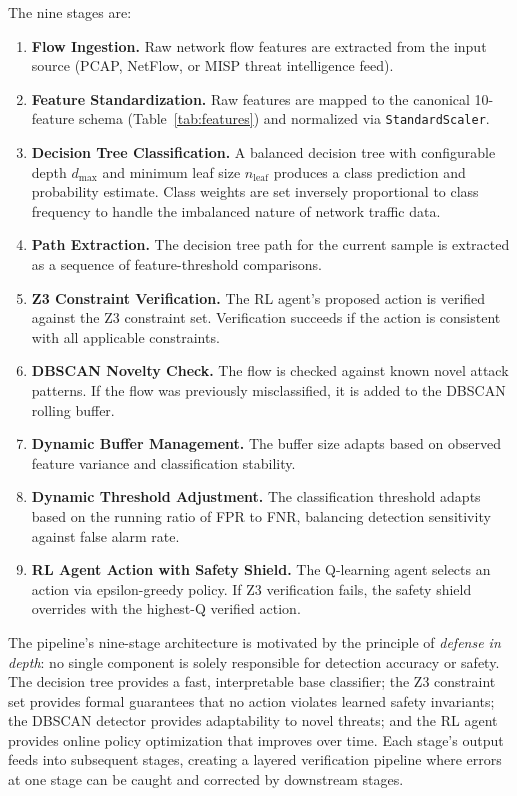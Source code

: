 \documentclass[12pt, letterpaper, oneside]{report}
\begin{document}
\noindent The nine stages are:
\begin{enumerate}[label=\textbf{Stage \arabic*:}, start=0]
    \item \textbf{Flow Ingestion.} Raw network flow features are extracted from the input source (PCAP, NetFlow, or MISP threat intelligence feed).
    \item \textbf{Feature Standardization.} Raw features are mapped to the canonical 10-feature schema (Table~\ref{tab:features}) and normalized via \texttt{StandardScaler}.
    \item \textbf{Decision Tree Classification.} A balanced decision tree with configurable depth $d_{\max}$ and minimum leaf size $n_{\text{leaf}}$ produces a class prediction and probability estimate. Class weights are set inversely proportional to class frequency to handle the imbalanced nature of network traffic data.
    \item \textbf{Path Extraction.} The decision tree path for the current sample is extracted as a sequence of feature-threshold comparisons.
    \item \textbf{Z3 Constraint Verification.} The RL agent's proposed action is verified against the Z3 constraint set. Verification succeeds if the action is consistent with all applicable constraints.
    \item \textbf{DBSCAN Novelty Check.} The flow is checked against known novel attack patterns. If the flow was previously misclassified, it is added to the DBSCAN rolling buffer.
    \item \textbf{Dynamic Buffer Management.} The buffer size adapts based on observed feature variance and classification stability.
    \item \textbf{Dynamic Threshold Adjustment.} The classification threshold adapts based on the running ratio of FPR to FNR, balancing detection sensitivity against false alarm rate.
    \item \textbf{RL Agent Action with Safety Shield.} The Q-learning agent selects an action via epsilon-greedy policy. If Z3 verification fails, the safety shield overrides with the highest-Q verified action.
\end{enumerate}

\noindent The pipeline's nine-stage architecture is motivated by the principle of \emph{defense in depth}: no single component is solely responsible for detection accuracy or safety. The decision tree provides a fast, interpretable base classifier; the Z3 constraint set provides formal guarantees that no action violates learned safety invariants; the DBSCAN detector provides adaptability to novel threats; and the RL agent provides online policy optimization that improves over time. Each stage's output feeds into subsequent stages, creating a layered verification pipeline where errors at one stage can be caught and corrected by downstream stages.
\end{document}
